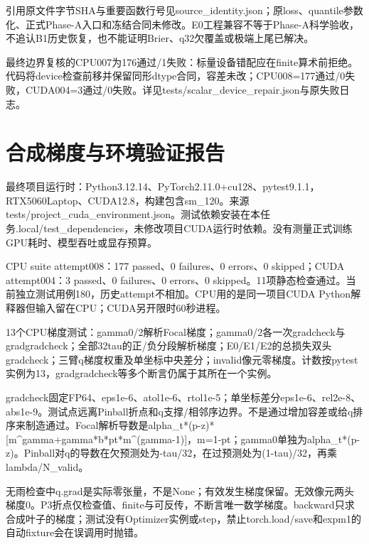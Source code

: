 \documentclass[UTF8,fontset=fandol,10pt]{ctexart}
\begin{document}
引用原文件字节SHA与重要函数行号见source\_\allowbreak{}identity.json；原loss、quantile参数化、正式Phase-A入口和冻结合同未修改。E0工程兼容不等于Phase-A科学验收，不追认B1历史恢复，也不能证明Brier、q32欠覆盖或极端上尾已解决。

最终边界复核的CPU007为176通过/\allowbreak{}1失败：标量设备错配应在finite算术前拒绝。代码将device检查前移并保留同形dtype合同，容差未改；CPU008=177通过/\allowbreak{}0失败，CUDA004=3通过/\allowbreak{}0失败。详见tests/\allowbreak{}scalar\_\allowbreak{}device\_\allowbreak{}repair.json与原失败日志。
\clearpage\section{合成梯度与环境验证报告}

最终项目运行时：Python3.12.14、PyTorch2.11.0+cu128、pytest9.1.1，RTX5060Laptop、CUDA12.8，构建包含sm\_\allowbreak{}120。来源tests/\allowbreak{}project\_\allowbreak{}cuda\_\allowbreak{}environment.json。测试依赖安装在本任务.local/\allowbreak{}test\_\allowbreak{}dependencies，未修改项目CUDA运行时依赖。没有测量正式训练GPU耗时、模型吞吐或显存预算。

CPU suite attempt008：177 passed、0 failures、0 errors、0 skipped；CUDA attempt004：3 passed、0 failures、0 errors、0 skipped。11项静态检查通过。当前独立测试用例180，历史attempt不相加。CPU用的是同一项目CUDA Python解释器但输入留在CPU；CUDA另开限时60秒进程。

13个CPU梯度测试：gamma0/\allowbreak{}2解析Focal梯度；gamma0/\allowbreak{}2各一次gradcheck与gradgradcheck；全部32tau的正/\allowbreak{}负分段解析梯度；E0/\allowbreak{}E1/\allowbreak{}E2的总损失双头gradcheck；三臂q梯度权重及单坐标中央差分；invalid像元零梯度。计数按pytest实例为13，gradgradcheck等多个断言仍属于其所在一个实例。

gradcheck固定FP64、eps1e-6、atol1e-6、rtol1e-5；单坐标差分eps1e-6、rel2e-8、abs1e-9。测试点远离Pinball折点和q支撑/\allowbreak{}相邻序边界。不是通过增加容差或给q排序来制造通过。Focal解析导数是alpha\_\allowbreak{}t*(p-z)*[m\textasciicircum{}gamma+gamma*b*pt*m\textasciicircum{}(gamma-1)]，m=1-pt；gamma0单独为alpha\_\allowbreak{}t*(p-z)。Pinball对q的导数在欠预测处为-tau/\allowbreak{}32，在过预测处为(1-tau)/\allowbreak{}32，再乘lambda/\allowbreak{}N\_\allowbreak{}valid。

无雨检查中q.grad是实际零张量，不是None；有效发生梯度保留。无效像元两头梯度0。P3折点仅检查值、finite与可反传，不断言唯一数学梯度。backward只求合成叶子的梯度；测试没有Optimizer实例或step，禁止torch.load/\allowbreak{}save和expm1的自动fixture会在误调用时抛错。
\end{document}
